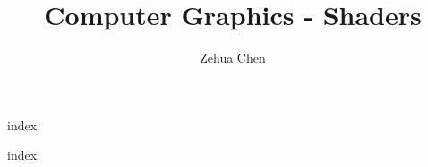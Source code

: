 \documentclass[letterpaper, 11pt]{report}
\title{Computer Graphics - Shaders}
\author{Zehua Chen}
\begin{document}
  \maketitle
  \tableofcontents

  \setmainstyles

  {index}

  \newpage
  \appendix
  {index}
\end{document}
